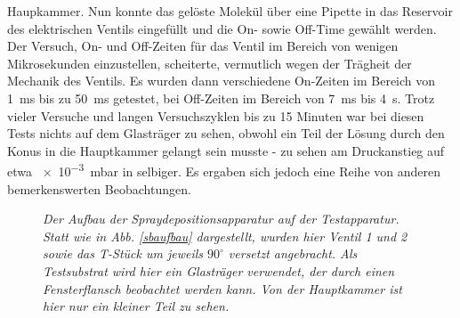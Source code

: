  Haupkammer. Nun konnte das gelöste Molekül über eine Pipette in das Reservoir des elektrischen
 Ventils eingefüllt und die On- sowie Off-Time gewählt werden. Der Versuch, On- und Off-Zeiten für
 das Ventil im Bereich von wenigen Mikrosekunden einzustellen, scheiterte, vermutlich wegen der
 Trägheit der Mechanik des Ventils. Es wurden dann verschiedene On-Zeiten im Bereich von \SI{1}{ms}
 bis zu \SI{50}{ms} getestet, bei Off-Zeiten im Bereich von \SI{7}{ms} bis \SI{4}{s}. Trotz vieler
 Versuche und langen Versuchszyklen bis zu 15 Minuten war bei diesen Tests nichts auf dem
 Glasträger zu sehen, obwohl ein Teil der Lösung durch den Konus in die Hauptkammer gelangt
 sein musste - zu sehen am Druckanstieg auf etwa \SI{e-3}{mbar} in selbiger. Es ergaben sich jedoch
 eine Reihe von anderen bemerkenswerten Beobachtungen.
 \\

 
\begin{figure}[H]
	\centering
	\sffamily
	
	\caption{\textit{Der Aufbau der Spraydepositionsapparatur auf der Testapparatur. Statt wie in Abb.
	\ref{sbaufbau} dargestellt, wurden hier Ventil 1 und 2 sowie das T-Stück um jeweils $90^{\circ}$
	versetzt angebracht. Als Testsubstrat wird hier ein Glasträger verwendet, der durch einen
	Fensterflansch beobachtet werden kann. Von der Hauptkammer ist hier nur ein kleiner Teil zu
	sehen.}}
\label{aufbau}
\end{figure}
 
 


 

